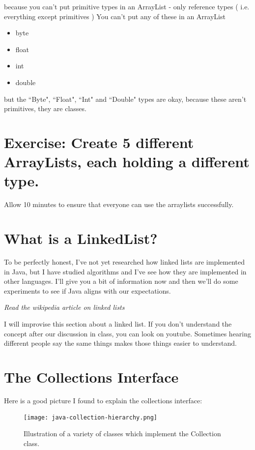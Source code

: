 \documentclass[10pt]{article}
\begin{document}
because you can't put primitive types in an ArrayList - only reference types ( i.e. everything except primitives )
You can't put any of these in an ArrayList

\begin{itemize}
\item byte
\item float
\item int
\item double
\end{itemize}

but the ``Byte", ``Float", ``Int" and ``Double" types are okay, because these aren't primitives, they are classes.


\section{Exercise: Create 5 different ArrayLists, each holding a different type.}

Allow 10 minutes to ensure that everyone can use the arraylists successfully.


\section{What is a LinkedList?}
To be perfectly honest, I've not yet researched how linked lists are implemented in Java, but I have studied algorithms and I've see how they are implemented in other languages. I'll give you a bit of information now and then we'll do some experiments to see if Java aligns with our expectations.


\textit{Read the wikipedia article on linked lists}

I will improvise this section about a linked list. If you don't understand the concept after our discussion in class, you can look on youtube. Sometimes hearing different people say the same things makes those things easier to understand.

\section{The Collections Interface}
Here is a good picture I found to explain the collections interface:

\begin{figure}[h]
  \centering
    \texttt{[image: java-collection-hierarchy.png]}
  \caption{Illustration of a variety of classes which implement the Collection class.}
\end{figure}
\end{document}
